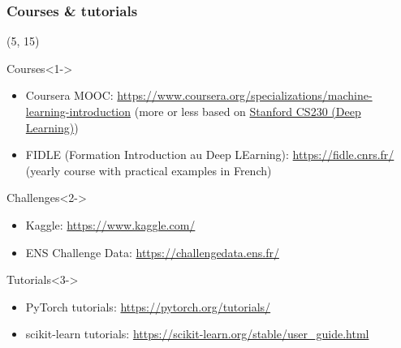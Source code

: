 \documentclass[10pt]{beamer}
\begin{document}
\begin{frame}
  \frametitle{Courses \& tutorials}

  \begin{textblock}{90}(5, 15)
    \begin{block}{Courses}<1->
      \begin{itemize}
      \item Coursera MOOC:
        \url{https://www.coursera.org/specializations/machine-learning-introduction} (more or less based on \href{https://cs230.stanford.edu/}{Stanford CS230 (Deep Learning)})
      \item FIDLE (Formation Introduction au Deep LEarning): \url{https://fidle.cnrs.fr/}
        (yearly course with practical examples in French)
      \end{itemize}
    \end{block}

    \begin{block}{Challenges}<2->
      \begin{itemize}
      \item Kaggle: \url{https://www.kaggle.com/}
      \item ENS Challenge Data: \url{https://challengedata.ens.fr/}
      \end{itemize}
    \end{block}

    \begin{block}{Tutorials}<3->
      \begin{itemize}
      \item PyTorch tutorials: \url{https://pytorch.org/tutorials/}
      \item scikit-learn tutorials:
        \url{https://scikit-learn.org/stable/user_guide.html}
      \end{itemize}
    \end{block}
  \end{textblock}
\end{frame}






\end{document}
